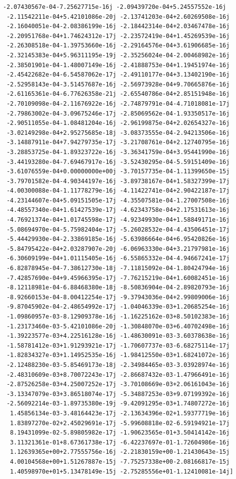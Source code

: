 \documentclass[12pt]{article}
\begin{document}
\begin{lstlisting}[caption=Results in vector form, label=lst:result]
 -2.07430567e-04-7.25627715e-16j -2.09439720e-04+5.24557552e-16j
 -2.11542211e-04+5.42101086e-20j -2.13741203e-04+2.60269508e-16j
 -2.16040051e-04-2.08386199e-16j -2.18442314e-04+2.03467478e-16j
 -2.20951768e-04+1.74624312e-17j -2.23572419e-04+1.45269539e-16j
 -2.26308518e-04-1.39753660e-16j -2.29164576e-04+3.61906685e-16j
 -2.32145383e-04+5.96311195e-19j -2.35256024e-04-2.00468982e-16j
 -2.38501901e-04-1.48007149e-16j -2.41888753e-04+1.19451974e-16j
 -2.45422682e-04-6.54587062e-17j -2.49110177e-04+3.13402190e-16j
 -2.52958143e-04-3.51457687e-16j -2.56973928e-04+9.70665876e-16j
 -2.61165361e-04-6.77626358e-21j -2.65540786e-04+2.85151948e-16j
 -2.70109098e-04-2.11676922e-16j -2.74879791e-04-4.71018081e-17j
 -2.79863002e-04-3.09675246e-17j -2.85069562e-04-1.93350517e-16j
 -2.90511055e-04-1.08481204e-16j -2.96199875e-04+2.02654327e-16j
 -3.02149298e-04+2.95275685e-18j -3.08373555e-04-2.94213506e-16j
 -3.14887911e-04+7.94279735e-17j -3.21708761e-04+2.12740795e-16j
 -3.28853725e-04-1.89323722e-16j -3.36341759e-04+3.95441990e-16j
 -3.44193280e-04-7.69467917e-16j -3.52430295e-04-5.59151409e-16j
 -3.61076559e-04+0.00000000e+00j -3.70157735e-04-1.11399650e-15j
 -3.79701582e-04-4.90344197e-16j -3.89738167e-04+1.58327399e-17j
 -4.00300088e-04-1.11778279e-16j -4.11422741e-04+2.90422187e-17j
 -4.23144607e-04+5.09151505e-17j -4.35507581e-04-1.27007508e-16j
 -4.48557340e-04+1.61427539e-17j -4.62343758e-04+2.17531613e-16j
 -4.76921374e-04+1.01745598e-17j -4.92349930e-04+1.58849171e-16j
 -5.08694970e-04-5.75982404e-17j -5.26028532e-04-4.43506451e-17j
 -5.44429930e-04-2.33869185e-16j -5.63986664e-04+6.95420826e-16j
 -5.84795422e-04+2.03287907e-20j -6.06963330e-04+3.21797981e-16j
 -6.30609199e-04+1.01115405e-16j -6.55865332e-04-4.94667241e-17j
 -6.82878945e-04-7.38612730e-18j -7.11815092e-04-1.80424794e-16j
 -7.42857690e-04+9.45966395e-17j -7.76215219e-04+1.60082451e-16j
 -8.12118981e-04-6.88468380e-18j -8.50836904e-04-2.89820793e-16j
 -8.92660153e-04-8.00412254e-17j -9.37943036e-04+2.99809006e-16j
 -9.87045902e-04-2.48654992e-17j -1.04046339e-03+1.20685254e-16j
 -1.09860957e-03-8.12909378e-16j -1.16225162e-03+8.50102383e-16j
 -1.23173460e-03-5.42101086e-20j -1.30848070e-03+6.40702498e-16j
 -1.39223577e-03+4.22516128e-16j -1.48630091e-03-3.60378638e-16j
 -1.58781412e-03+1.91293921e-17j -1.70607737e-03-6.68275114e-17j
 -1.82834327e-03+1.14952535e-16j -1.98412550e-03+1.68241072e-16j
 -2.12488230e-03-5.85469173e-18j -2.34984465e-03-3.03928974e-16j
 -2.48310609e-03+8.70072243e-17j -2.86687432e-03-1.47966491e-16j
 -2.87526258e-03+4.25007252e-17j -3.70108669e-03+2.06161043e-16j
 -3.13347079e-03+3.86518074e-17j -5.34887253e-03+9.07199392e-16j
 -2.56092214e-03-1.89735380e-19j -9.42091295e-03+1.74807272e-16j
  1.45856134e-03-3.48164423e-17j -2.13634396e-02+1.59377719e-16j
  1.83897270e-02+2.45029691e-17j -5.99608818e-02-6.59194921e-17j
  8.19431099e-02-5.89805982e-17j -1.90623565e-01+3.50414142e-16j
  3.11321361e-01+8.67361738e-17j -6.42237697e-01-1.72604986e-16j
  1.12639365e+00+2.77555756e-16j -2.21830159e+00-1.21430643e-15j
  4.00104568e+00+1.51267887e-15j -7.75257338e+00-2.08166817e-15j
  1.40598970e+01+5.13478149e-15j -2.75285556e+01-1.12410081e-14j]
\end{lstlisting}
\end{document}
